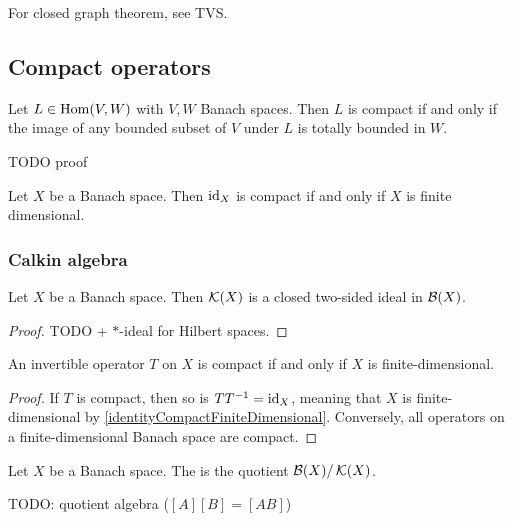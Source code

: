 For closed graph theorem, see TVS.


\subsection{Compact operators}
\begin{proposition}
Let $L\in\operatorname{Hom}(V,W)$ with $V,W$ Banach spaces. Then $L$ is compact \textup{if and only if} the image of any bounded subset of $V$ under $L$ is totally bounded in $W$.
\end{proposition}
TODO proof

\begin{lemma} \label{identityCompactFiniteDimensional}
Let $X$ be a Banach space. Then $\operatorname{id}_X$ is compact \textup{if and only if} $X$ is finite dimensional.
\end{lemma}

\subsubsection{Calkin algebra}
\begin{proposition}
Let $X$ be a Banach space. Then $\operatorname{\mathcal{K}}(X)$ is a closed two-sided ideal in $\operatorname{\mathcal{B}}(X)$.
\end{proposition}
\begin{proof}
TODO + $*$-ideal for Hilbert spaces.
\end{proof}
\begin{corollary}
An invertible operator $T$ on $X$ is compact \textup{if and only if} $X$ is finite-dimensional.
\end{corollary}
\begin{proof}
If $T$ is compact, then so is $TT^{-1} = \operatorname{id}_X$, meaning that $X$ is finite-dimensional by \ref{identityCompactFiniteDimensional}. Conversely, all operators on a finite-dimensional Banach space are compact.
\end{proof}

\begin{definition}
Let $X$ be a Banach space. The  is the quotient $\operatorname{\mathcal{B}}(X)/\operatorname{\mathcal{K}}(X)$.
\end{definition}
TODO: quotient algebra ($[A][B] = [AB]$)

